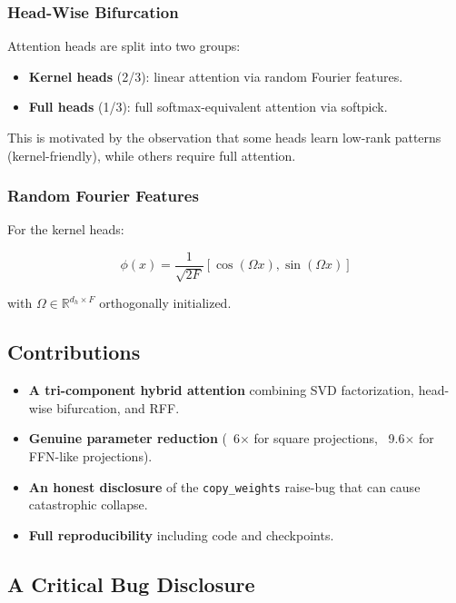 \subsubsection{Head-Wise Bifurcation}

Attention heads are split into two groups:

\begin{itemize}
\item \textbf{Kernel heads} (2/3): linear attention via random Fourier features.
\item \textbf{Full heads} (1/3): full softmax-equivalent attention via softpick.

\end{itemize}
This is motivated by the observation that some heads learn low-rank 
patterns (kernel-friendly), while others require full attention.

\subsubsection{Random Fourier Features}

For the kernel heads:

\[
\phi(x) = \frac{1}{\sqrt{2F}} [\cos(\Omega x), \sin(\Omega x)]
\]

with $\Omega \in \mathbb{R}^{d_h \times F}$ orthogonally initialized.

\subsection{Contributions}

\begin{itemize}
\item \textbf{A tri-component hybrid attention} combining SVD factorization,
  head-wise bifurcation, and RFF.
\item \textbf{Genuine parameter reduction} (~6$\times$ for square projections, ~9.6$\times$ for
  FFN-like projections).
\item \textbf{An honest disclosure} of the \texttt{copy\_weights} raise-bug that can cause
  catastrophic collapse.
\item \textbf{Full reproducibility} including code and checkpoints.

\end{itemize}
\subsection{A Critical Bug Disclosure}

